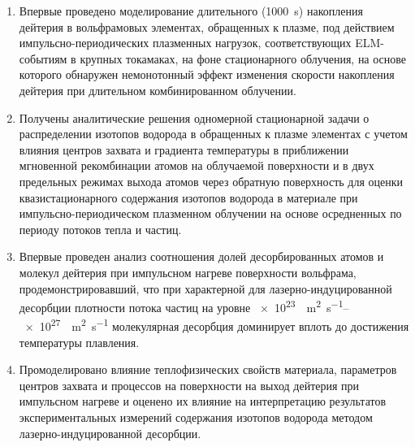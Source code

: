 {\novelty}
\begin{enumerate}[beginpenalty=10000] %
    \item Впервые проведено моделирование длительного (\SI{1000}{\second}) накопления дейтерия в вольфрамовых элементах, обращенных к плазме, под действием импульсно-периодических плазменных нагрузок, соответствующих ELM-событиям в крупных токамаках, на фоне стационарного облучения, на основе которого обнаружен немонотонный эффект изменения скорости накопления дейтерия при длительном комбинированном облучении.
    \item Получены аналитические решения одномерной стационарной задачи о распределении изотопов водорода в обращенных к плазме элементах с учетом влияния центров захвата и градиента температуры в приближении мгновенной рекомбинации атомов на облучаемой поверхности и в двух предельных режимах выхода атомов через обратную поверхность для оценки квазистационарного содержания изотопов водорода в материале при импульсно-периодическом плазменном облучении на основе осредненных по периоду потоков тепла и частиц.
    \item Впервые проведен анализ соотношения долей десорбированных атомов и молекул дейтерия при импульсном нагреве поверхности вольфрама, продемонстрировавший, что при характерной для лазерно-индуцированной десорбции плотности потока частиц на уровне \SIrange{e23}{e27}{\per\meter\squared\per\second} молекулярная десорбция доминирует вплоть до достижения температуры плавления.
    \item Промоделировано влияние теплофизических свойств материала, параметров центров захвата и процессов на поверхности на выход дейтерия при импульсном нагреве и оценено их влияние на интерпретацию результатов экспериментальных измерений содержания изотопов водорода методом лазерно-индуцированной десорбции.
\end{enumerate}

